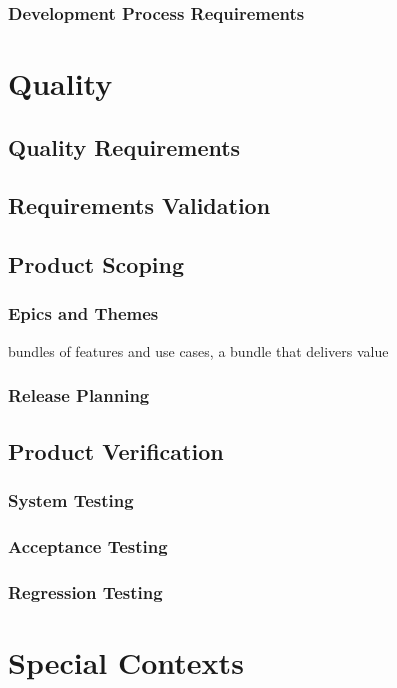\documentclass{reqengbook}
\begin{document}
\section{Development Process Requirements}


\part{Quality}

\chapter{Quality Requirements}

\chapter{Requirements Validation}

\chapter{Product Scoping}

\section{Epics and Themes}

bundles of features and use cases, a bundle that delivers value

\section{Release Planning} 

\chapter{Product Verification}
\section{System Testing}
\section{Acceptance Testing}
\section{Regression Testing}

\part{Special Contexts}
\end{document}
